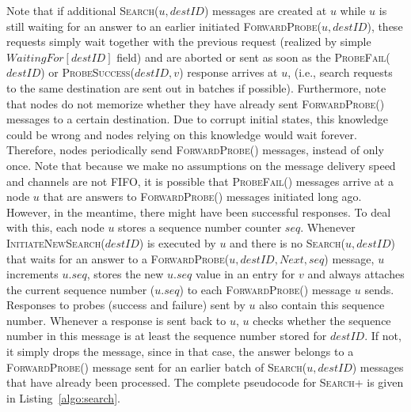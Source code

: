 \documentclass[a4paper,USenglish]{lipics}
\newcommand{\srp}{\textsc{Search+}\xspace}
\newcommand{\search}[1]{\textsc{Search(\ensuremath{#1})}\xspace}
\newcommand{\initsearch}[1]{\textsc{InitiateNewSearch(\ensuremath{#1})}\xspace}
\newcommand{\forwardprobe}[1]{\textsc{ForwardProbe(\ensuremath{#1})}\xspace}
\newcommand{\psuccess}[1]{\textsc{ProbeSuccess(\ensuremath{#1})}\xspace}
\newcommand{\pfail}[1]{\textsc{ProbeFail(\ensuremath{#1})}\xspace}
\begin{document}
Note that if additional \search{u,destID} messages are created at $u$ while $u$ is still waiting for an answer to an earlier initiated \forwardprobe{u,destID}, these requests simply wait together with the previous request (realized by simple $WaitingFor[destID]$ field) and are aborted or sent as soon as the \pfail{destID} or \psuccess{destID,v} response arrives at $u$, (i.e., search requests to the same destination are sent out in batches if possible).
Furthermore, note that nodes do not memorize whether they have already sent \forwardprobe{} messages to a certain destination. Due to corrupt initial states, this knowledge could be wrong and nodes relying on this knowledge would wait forever.
Therefore, nodes periodically send \forwardprobe{} messages, instead of only once.
Note that because we make no assumptions on the message delivery speed and channels are not FIFO, it is possible that \pfail{} messages arrive at a node $u$ that are answers to \forwardprobe{} messages initiated long ago.
However, in the meantime, there might have been successful responses.
To deal with this, each node $u$ stores a sequence number counter $seq$.
Whenever \initsearch{destID} is executed by $u$ and there is no \search{u,destID} that waits for an answer to a \forwardprobe{u,destID, Next, seq} message, $u$ increments $u.seq$, stores the new $u.seq$ value in an entry for $v$ and always attaches the current sequence number ($u.seq$) to each \forwardprobe{} message $u$ sends.
Responses to probes (success and failure) sent by $u$ also contain this sequence number.
Whenever a response is sent back to $u$, $u$ checks whether the sequence number in this message is at least the sequence number stored for $destID$.
If not, it simply drops the message, since in that case, the answer belongs to a \forwardprobe{} message sent for an earlier batch of \search{u,destID} messages that have already been processed.
The complete pseudocode for \srp is given in Listing~\ref{algo:search}.
\end{document}
